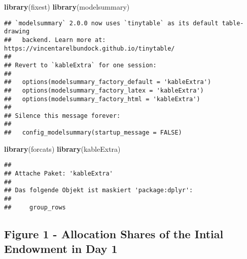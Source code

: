 \documentclass[
]{article}
\newenvironment{Shaded}{\begin{snugshade}}{\end{snugshade}}
\newcommand{\FunctionTok}[1]{\textcolor[rgb]{0.13,0.29,0.53}{\textbf{#1}}}
\newcommand{\NormalTok}[1]{#1}
\begin{document}
\begin{Shaded}
\begin{Highlighting}[]
\FunctionTok{library}\NormalTok{(fixest)}
\FunctionTok{library}\NormalTok{(modelsummary)}
\end{Highlighting}
\end{Shaded}

\begin{verbatim}
## `modelsummary` 2.0.0 now uses `tinytable` as its default table-drawing
##   backend. Learn more at: https://vincentarelbundock.github.io/tinytable/
## 
## Revert to `kableExtra` for one session:
## 
##   options(modelsummary_factory_default = 'kableExtra')
##   options(modelsummary_factory_latex = 'kableExtra')
##   options(modelsummary_factory_html = 'kableExtra')
## 
## Silence this message forever:
## 
##   config_modelsummary(startup_message = FALSE)
\end{verbatim}

\begin{Shaded}
\begin{Highlighting}[]
\FunctionTok{library}\NormalTok{(forcats)}
\FunctionTok{library}\NormalTok{(kableExtra)}
\end{Highlighting}
\end{Shaded}

\begin{verbatim}
## 
## Attache Paket: 'kableExtra'
## 
## Das folgende Objekt ist maskiert 'package:dplyr':
## 
##     group_rows
\end{verbatim}

\subsection{Figure 1 - Allocation Shares of the Intial Endowment in Day
1}\label{figure-1---allocation-shares-of-the-intial-endowment-in-day-1}
\end{document}
